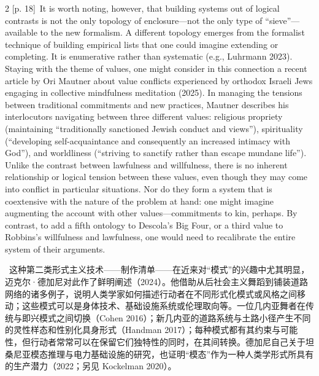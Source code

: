 \documentclass[10pt,a4paper]{article}
\begin{document}
\begin{paracol}{2}
{\scriptsize\color{gray} [p. 18]}\ It is worth noting, however, that building systems out of logical contrasts is not the only topology of enclosure—not the only type of “sieve”—available to the new formalism. A different topology emerges from the formalist technique of building empirical lists that one could imagine extending or completing. It is enumerative rather than systematic (e.g., Luhrmann 2023). Staying with the theme of values, one might consider in this connection a recent article by Ori Mautner about value conflicts experienced by orthodox Israeli Jews engaging in collective mindfulness meditation (2025). In managing the tensions between traditional commitments and new practices, Mautner describes his interlocutors navigating between three different values: religious propriety (maintaining “traditionally sanctioned Jewish conduct and views”), spirituality (“developing self-acquaintance and consequently an increased intimacy with God”), and worldliness (“striving to sanctify rather than escape mundane life”). Unlike the contrast between lawfulness and willfulness, there is no inherent relationship or logical tension between these values, even though they may come into conflict in particular situations. Nor do they form a system that is coextensive with the nature of the problem at hand: one might imagine augmenting the account with other values—commitments to kin, perhaps. By contrast, to add a fifth ontology to Descola’s Big Four, or a third value to Robbins’s willfulness and lawfulness, one would need to recalibrate the entire system of their arguments.\par
\switchcolumn*
{\scriptsize\color{gray} [p. 19]}\ 这种第二类形式主义技术——制作清单——在近来对“模式”的兴趣中尤其明显，迈克尔·德加尼对此作了鲜明阐述（2024）。他借助从后社会主义舞蹈到铺装道路网络的诸多例子，说明人类学家如何描述行动者在不同形式化模式或风格之间移动；这些模式可以是身体技术、基础设施系统或伦理取向等。一位几内亚舞者在传统与即兴模式之间切换（Cohen 2016）；新几内亚的道路系统与土路小径产生不同的灵性样态和性别化具身形式（Handman 2017）；每种模式都有其约束与可能性，但行动者常常可以在保留它们独特性的同时，在其间转换。德加尼自己关于坦桑尼亚模态推理与电力基础设施的研究，也证明“模态”作为一种人类学形式所具有的生产潜力（2022；另见 Kockelman 2020）。\par
\switchcolumn

\end{paracol}
\end{document}
